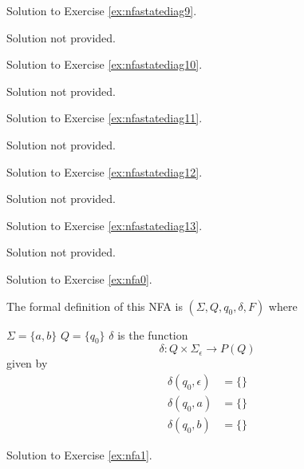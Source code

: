 Solution to Exercise \ref{ex:nfastatediag9}.


    Solution not provided.
    

\newpage

Solution to Exercise \ref{ex:nfastatediag10}.


    Solution not provided.
    

\newpage

Solution to Exercise \ref{ex:nfastatediag11}.


    Solution not provided.
    

\newpage

Solution to Exercise \ref{ex:nfastatediag12}.


    Solution not provided.
    

\newpage

Solution to Exercise \ref{ex:nfastatediag13}.


    Solution not provided.
    

\newpage

Solution to Exercise \ref{ex:nfa0}.

The formal definition of this NFA is $(\Sigma, Q, q_0, \delta, F)$ where
\begin{tightlist}
\li $\Sigma = \{a,b\}$
\li $Q = \{q_0\}$
\li $\delta$ is the function
\[
\delta : Q \times \Sigma_\epsilon \rightarrow P(Q)
\]
given by
\begin{align*}
  \delta(q_0, \epsilon) &= \{\} \\
  \delta(q_0, a) &= \{\} \\
  \delta(q_0, b) &= \{\} 
\end{align*}
\end{tightlist}


\newpage

Solution to Exercise \ref{ex:nfa1}.

